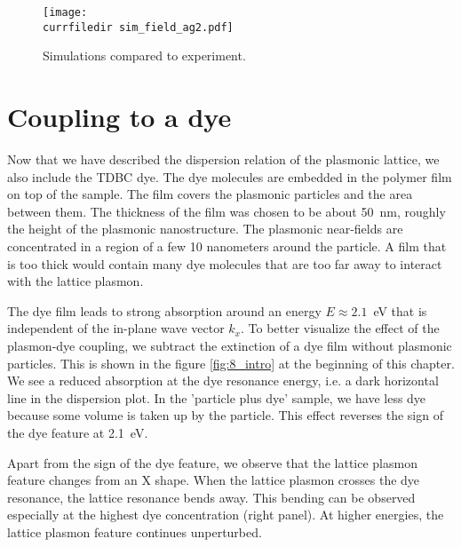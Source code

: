 \begin{figure}
  \texttt{[image: \\currfiledir sim\_field\_ag2.pdf]}
  \caption{Simulations compared to experiment. \label{fig:8_sim_without_dye} }
\end{figure}
  

  \section{Coupling to a dye}
  Now that we have described the dispersion relation of the plasmonic lattice, we also include the TDBC dye. The dye molecules are embedded in the polymer film on top of the sample. The film covers the plasmonic particles and the area between them. The thickness of the film was chosen to be about 50~nm, roughly the height of the plasmonic nanostructure. The plasmonic near-fields are concentrated in a region of a few 10 nanometers around the particle. A film that is too thick would contain many dye molecules that are too far away to interact with the lattice plasmon.

  The dye film leads to strong absorption around an energy $E \approx 2.1$~eV that is independent of the in-plane wave vector $k_x$. To better visualize the effect of the plasmon-dye coupling, we subtract the extinction of a dye film without plasmonic particles. This is shown in the figure \ref{fig:8_intro} at the beginning of this chapter. We see a reduced absorption at the dye resonance energy, i.e. a dark horizontal line in the dispersion plot. In the 'particle plus dye' sample, we have less dye because some volume is taken up by the particle. This effect reverses the sign of the dye feature at 2.1~eV.
  
  Apart from the sign of the dye feature, we observe that the lattice plasmon feature changes from an X shape. When the lattice plasmon crosses the dye resonance, the lattice resonance bends away. This bending can be observed especially at the highest dye concentration (right panel). At higher energies, the lattice plasmon feature continues unperturbed.


